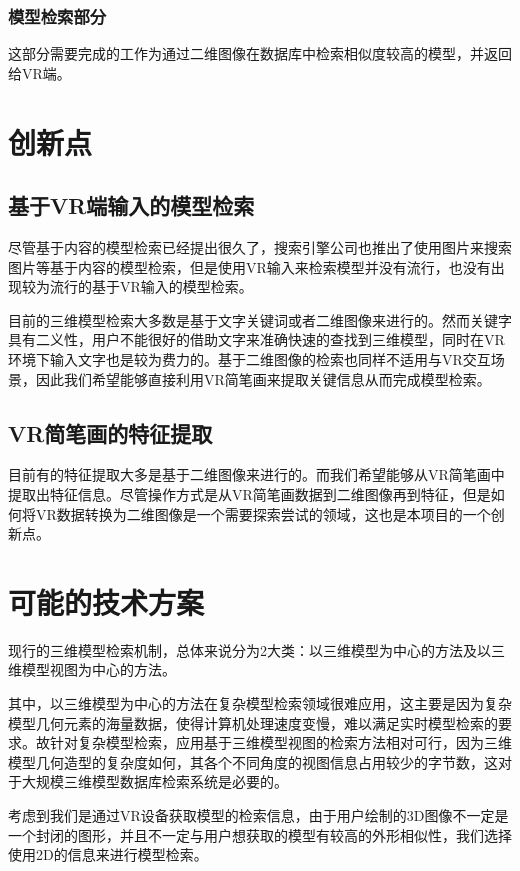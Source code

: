 \documentclass{article}
\begin{document}
\subsubsection{模型检索部分}
这部分需要完成的工作为通过二维图像在数据库中检索相似度较高的模型，并返回给VR端。


\section{创新点}
\subsection{基于VR端输入的模型检索}
尽管基于内容的模型检索已经提出很久了，搜索引擎公司也推出了使用图片来搜索图片等基于内容的模型检索，但是使用VR输入来检索模型并没有流行，也没有出现较为流行的基于VR输入的模型检索。  

目前的三维模型检索大多数是基于文字关键词或者二维图像来进行的。然而关键字具有二义性，用户不能很好的借助文字来准确快速的查找到三维模型，同时在VR环境下输入文字也是较为费力的。基于二维图像的检索也同样不适用与VR交互场景，因此我们希望能够直接利用VR简笔画来提取关键信息从而完成模型检索。

\subsection{VR简笔画的特征提取}
目前有的特征提取大多是基于二维图像来进行的。而我们希望能够从VR简笔画中提取出特征信息。尽管操作方式是从VR简笔画数据到二维图像再到特征，但是如何将VR数据转换为二维图像是一个需要探索尝试的领域，这也是本项目的一个创新点。  


\section{可能的技术方案}

现行的三维模型检索机制，总体来说分为2大类：以三维模型为中心的方法及以三维模型视图为中心的方法。

其中，以三维模型为中心的方法在复杂模型检索领域很难应用，这主要是因为复杂模型几何元素的海量数据，使得计算机处理速度变慢，难以满足实时模型检索的要求。故针对复杂模型检索，应用基于三维模型视图的检索方法相对可行，因为三维模型几何造型的复杂度如何，其各个不同角度的视图信息占用较少的字节数，这对于大规模三维模型数据库检索系统是必要的。

考虑到我们是通过VR设备获取模型的检索信息，由于用户绘制的3D图像不一定是一个封闭的图形，并且不一定与用户想获取的模型有较高的外形相似性，我们选择使用2D的信息来进行模型检索。
\end{document}
